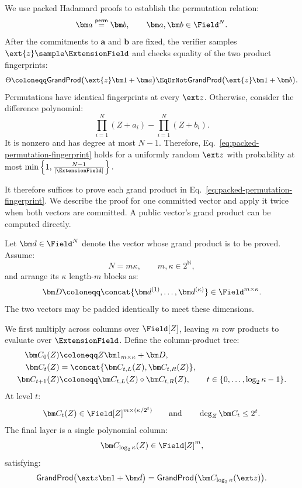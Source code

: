 We use packed Hadamard proofs to establish the permutation relation:
\[
    \bm a\stackrel{\mathsf{perm}}{=}\bm b,
    \qquad
    \bm a,\bm b\in\Field^N.
\]
After the commitments to \(\bm a\) and \(\bm b\) are fixed, the
verifier samples
\(
    \ext{z}\sample\ExtensionField
\)
and checks equality of the two product fingerprints:
\begin{equation}
   \Theta \coloneqq  \mathsf{GrandProd}
    \bigl(\ext{z}\bm 1+\bm a\bigr)
    \EqOrNot
    \mathsf{GrandProd}
    \bigl(\ext{z}\bm 1+\bm b\bigr).
\label{eq:packed-permutation-fingerprint}
\end{equation}
Permutations have identical fingerprints at every \(\ext z\).
Otherwise, consider the difference polynomial:
\[
    \prod_{i=1}^{N}(Z+a_i)
    -
    \prod_{i=1}^{N}(Z+b_i).
\]
It is nonzero and has degree at most \(N-1\). Therefore,
Eq.~\eqref{eq:packed-permutation-fingerprint} holds for a
uniformly random \(\ext z\) with probability at most
\(
    \min\left\{
        1,\frac{N-1}{|\ExtensionField|}
    \right\}.
\)

It therefore suffices to prove each grand product in
Eq.~\eqref{eq:packed-permutation-fingerprint}. We describe the
proof for one committed vector and apply it twice when both
vectors are committed. A public vector's grand product can be
computed directly.

Let \(\bm d\in\Field^N\) denote the vector whose grand product is
to be proved. Assume:
\[
    N=m\kappa,
    \qquad
    m,\kappa\in2^{\mathbb N},
\]
and arrange its \(\kappa\) length-\(m\) blocks as:
\[
    \bm D
    \coloneqq
    \concat{
        \bm d^{(1)},\ldots,\bm d^{(\kappa)}
    }
    \in\Field^{m\times\kappa}.
\]
The two vectors may be padded identically to meet these dimensions.

We first multiply across columns over \(\Field[Z]\), leaving
\(m\) row products to evaluate over \(\ExtensionField\).
Define the column-product tree:
\begin{equation}
\begin{aligned}
    \bm C_0(Z)
    &\coloneqq
    Z\bm 1_{m\times\kappa}+\bm D,\\
    \bm C_t(Z)
    &=
    \concat{
        \bm C_{t,L}(Z),
        \bm C_{t,R}(Z)
    },\\
    \bm C_{t+1}(Z)
    &\coloneqq
    \bm C_{t,L}(Z)
    \circ
    \bm C_{t,R}(Z),
    \qquad
    t\in\{0,\ldots,\log_2\kappa-1\}.
\end{aligned}
\label{eq:packed-permutation-product-tree}
\end{equation}
At level \(t\):
\[
    \bm C_t(Z)
    \in
    \Field[Z]^{m\times(\kappa/2^t)}
    \qquad\text{and}\qquad
    \deg_Z\bm C_t\leq2^t.
\]
The final layer is a single polynomial column:
\[
    \bm C_{\log_2 \kappa}(Z)
    \in\Field[Z]^m,
\]
satisfying:
\begin{equation*}
    \mathsf{GrandProd}
    \bigl(\ext z\bm 1+\bm d\bigr)
    =
    \mathsf{GrandProd}
    \bigl(\bm C_{\log_2 \kappa}(\ext z)\bigr).
\end{equation*}

